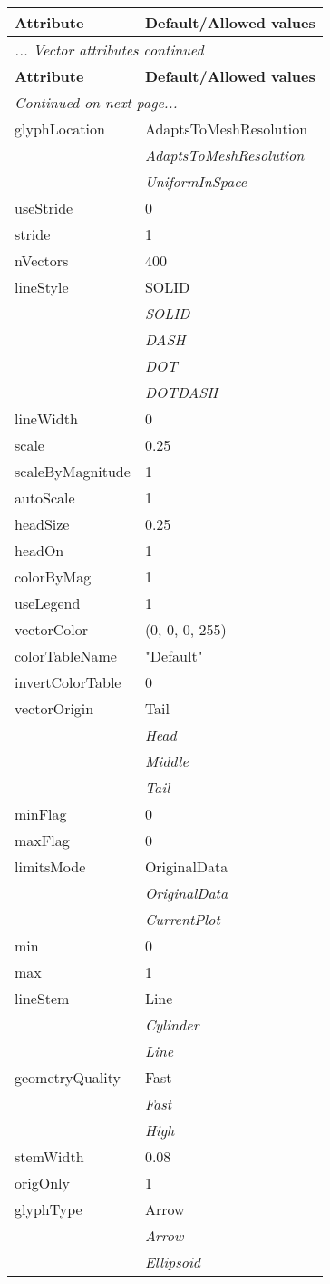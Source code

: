 \documentclass[10pt,a4paper]{report}
\begin{document}
\begin{longtable}{ll}
{\bf Attribute} & {\bf Default/Allowed values} \\
\hline \hline
\endfirsthead
\multicolumn{2}{l}{{\it ... Vector attributes continued}} \\
{\bf Attribute} & {\bf Default/Allowed values} \\
\hline \hline
\endhead
\hline
\multicolumn{2}{l}{{\it Continued on next page...}} \\
\endfoot
\hline
\endlastfoot

glyphLocation  &  AdaptsToMeshResolution   \\
 & {\it  AdaptsToMeshResolution} \\
 & {\it  UniformInSpace} \\
useStride  &  0 \\
stride  &  1 \\
nVectors  &  400 \\
lineStyle  &  SOLID   \\
 & {\it  SOLID} \\
 & {\it  DASH} \\
 & {\it  DOT} \\
 & {\it  DOTDASH} \\
lineWidth  &  0 \\
scale  &  0.25 \\
scaleByMagnitude  &  1 \\
autoScale  &  1 \\
headSize  &  0.25 \\
headOn  &  1 \\
colorByMag  &  1 \\
useLegend  &  1 \\
vectorColor  &  (0, 0, 0, 255) \\
colorTableName  &  "Default" \\
invertColorTable  &  0 \\
vectorOrigin  &  Tail   \\
 & {\it  Head} \\
 & {\it  Middle} \\
 & {\it  Tail} \\
minFlag  &  0 \\
maxFlag  &  0 \\
limitsMode  &  OriginalData   \\
 & {\it  OriginalData} \\
 & {\it  CurrentPlot} \\
min  &  0 \\
max  &  1 \\
lineStem  &  Line   \\
 & {\it  Cylinder} \\
 & {\it  Line} \\
geometryQuality  &  Fast   \\
 & {\it  Fast} \\
 & {\it  High} \\
stemWidth  &  0.08 \\
origOnly  &  1 \\
glyphType  &  Arrow   \\
 & {\it  Arrow} \\
 & {\it  Ellipsoid} \\
\end{longtable}
\end{document}
